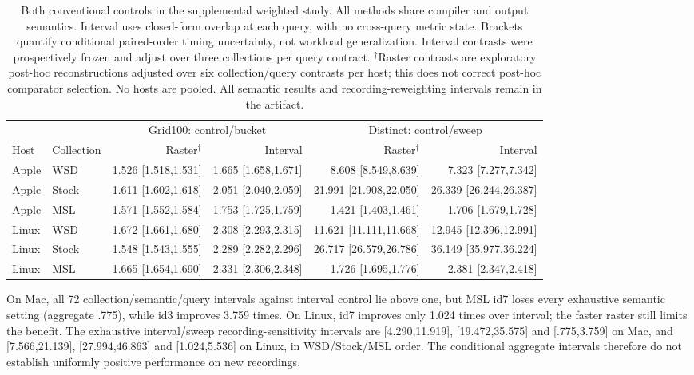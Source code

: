 \begin{table}[t]\centering\small
\begin{tabular}{llrrrr}\toprule
& & \multicolumn{2}{c}{Grid100: control/bucket} & \multicolumn{2}{c}{Distinct: control/sweep}\\
Host & Collection & Raster$^{\dagger}$ & Interval & Raster$^{\dagger}$ & Interval\\\midrule
Apple & WSD & 1.526 [1.518,1.531] & 1.665 [1.658,1.671] & 8.608 [8.549,8.639] & 7.323 [7.277,7.342]\\
Apple & Stock & 1.611 [1.602,1.618] & 2.051 [2.040,2.059] & 21.991 [21.908,22.050] & 26.339 [26.244,26.387]\\
Apple & MSL & 1.571 [1.552,1.584] & 1.753 [1.725,1.759] & 1.421 [1.403,1.461] & 1.706 [1.679,1.728]\\
Linux & WSD & 1.672 [1.661,1.680] & 2.308 [2.293,2.315] & 11.621 [11.111,11.668] & 12.945 [12.396,12.991]\\
Linux & Stock & 1.548 [1.543,1.555] & 2.289 [2.282,2.296] & 26.717 [26.579,26.786] & 36.149 [35.977,36.224]\\
Linux & MSL & 1.665 [1.654,1.690] & 2.331 [2.306,2.348] & 1.726 [1.695,1.776] & 2.381 [2.347,2.418]\\
\bottomrule\end{tabular}
\caption{Both conventional controls in the supplemental weighted study.
All methods share compiler and output semantics. Interval uses closed-form
overlap at each query, with no cross-query metric state. Brackets quantify
conditional paired-order timing uncertainty, not workload generalization.
Interval contrasts were prospectively frozen and adjust over three collections
per query contract. $^{\dagger}$Raster contrasts are exploratory post-hoc
reconstructions adjusted over six collection/query contrasts per host; this
does not correct post-hoc comparator selection. No hosts are pooled. All
semantic results and recording-reweighting intervals remain in the artifact.}
\label{tab:interval-control}
\end{table}

On Mac, all 72 collection/semantic/query intervals against interval control
lie above one, but MSL id7 loses every exhaustive semantic setting
(aggregate .775), while id3 improves 3.759 times. On Linux, id7 improves only
1.024 times over interval; the faster raster still limits the benefit.
The exhaustive interval/sweep recording-sensitivity intervals are
[4.290,11.919], [19.472,35.575] and [.775,3.759] on Mac, and
[7.566,21.139], [27.994,46.863] and [1.024,5.536] on Linux, in WSD/Stock/MSL order.
The conditional aggregate intervals therefore do not establish uniformly
positive performance on new recordings.

